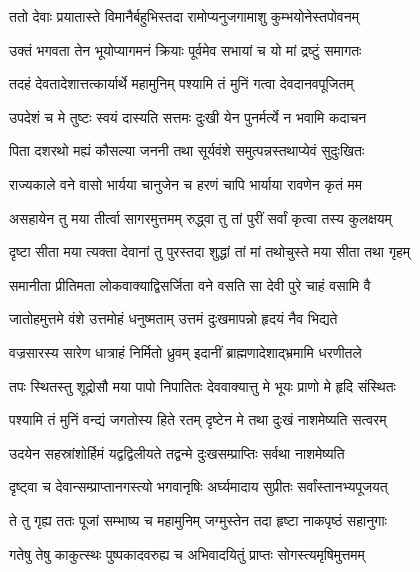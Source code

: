 

\twolineshloka
{ततो देवाः प्रयातास्ते विमानैर्बहुभिस्तदा}
{रामोप्यनुजगामाशु कुम्भयोनेस्तपोवनम्}%

\twolineshloka
{उक्तं भगवता तेन भूयोप्यागमनं क्रियाः}
{पूर्वमेव सभायां च यो मां द्रष्टुं समागतः}%

\twolineshloka
{तदहं देवतादेशात्तत्कार्यार्थे महामुनिम्}
{पश्यामि तं मुनिं गत्वा देवदानवपूजितम्}%

\twolineshloka
{उपदेशं च मे तुष्टः स्वयं दास्यति सत्तमः}
{दुःखी येन पुनर्मर्त्ये न भवामि कदाचन}%

\twolineshloka
{पिता दशरथो मह्यं कौसल्या जननी तथा}
{सूर्यवंशे समुत्पन्नस्तथाप्येवं सुदुःखितः}%

\twolineshloka
{राज्यकाले वने वासो भार्यया चानुजेन च}
{हरणं चापि भार्याया रावणेन कृतं मम}%

\twolineshloka
{असहायेन तु मया तीर्त्वा सागरमुत्तमम्}
{रुद्ध्वा तु तां पुरीं सर्वां कृत्वा तस्य कुलक्षयम्}%

\twolineshloka
{दृष्टा सीता मया त्यक्ता देवानां तु पुरस्तदा}
{शुद्धां तां मां तथोचुस्ते मया सीता तथा गृहम्}%

\twolineshloka
{समानीता प्रीतिमता लोकवाक्याद्विसर्जिता}
{वने वसति सा देवी पुरे चाहं वसामि वै}%

\twolineshloka
{जातोहमुत्तमे वंशे उत्तमोहं धनुष्मताम्}
{उत्तमं दुःखमापन्नो हृदयं नैव भिद्यते}%

\twolineshloka
{वज्रसारस्य सारेण धात्राहं निर्मितो ध्रुवम्}
{इदानीं ब्राह्मणादेशाद्भ्रमामि धरणीतले}%

\twolineshloka
{तपः स्थितस्तु शूद्रोसौ मया पापो निपातितः}
{देववाक्यात्तु मे भूयः प्राणो मे हृदि संस्थितः}%

\twolineshloka
{पश्यामि तं मुनिं वन्द्यं जगतोस्य हिते रतम्}
{दृष्टेन मे तथा दुःखं नाशमेष्यति सत्वरम्}%

\twolineshloka
{उदयेन सहस्रांशोर्हिमं यद्वद्विलीयते}
{तद्वन्मे दुःखसम्प्राप्तिः सर्वथा नाशमेष्यति}%

\twolineshloka
{दृष्ट्वा च देवान्सम्प्राप्तानगस्त्यो भगवानृषिः}
{अर्घ्यमादाय सुप्रीतः सर्वांस्तानभ्यपूजयत्}%

\twolineshloka
{ते तु गृह्य ततः पूजां सम्भाष्य च महामुनिम्}
{जग्मुस्तेन तदा हृष्टा नाकपृष्ठं सहानुगाः}%

\twolineshloka
{गतेषु तेषु काकुत्स्थः पुष्पकादवरुह्य च}
{अभिवादयितुं प्राप्तः सोगस्त्यमृषिमुत्तमम्}%



